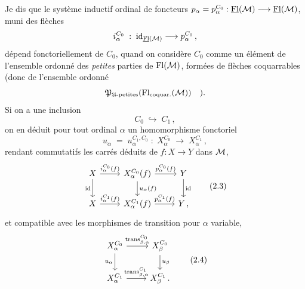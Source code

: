 Je dis que le système inductif ordinal de foncteurs $p_\alpha=p_\alpha^{C_0} : \underline{\mathrm{Fl}}(\mathcal{M})\longrightarrow\underline{\mathrm{Fl}}(\mathcal{M})$,
muni des flèches
\[
i_\alpha^{C_0} \;:\; \mathrm{id}_{\underline{\mathrm{Fl}}(\mathcal{M})} \longrightarrow p_\alpha^{C_0}\,,
\]
dépend fonctoriellement de $C_0$, quand on considère $C_0$ comme un élément de l'ensemble ordonné des \textit{petites} parties de $\mathrm{Fl}(\mathcal{M})$, formées de flèches coquarrables (donc de l'ensemble ordonné
\[
\mathfrak{P}_{\mathfrak{U}\text{-petites}}(\mathrm{Fl}_{\text{coquar.}}(\mathcal{M})) \quad ).
\]
Si on a une inclusion
\[
C_0 \;\hookrightarrow\; C_1\,,
\tag*{(2.1)}
\]
on en déduit pour tout ordinal $\alpha$ un homomorphisme fonctoriel
\[
u_\alpha \;=\; u_\alpha^{C_1,C_0} \;:\; X_\alpha^{C_0} \;\longrightarrow\; X_\alpha^{C_1}\,,
\tag*{(2.2)}
\]
rendant commutatifs les carrés déduits de $f : X\longrightarrow Y$ dans $\mathcal{M}$,
\[
\begin{tikzcd}
X \arrow[r, "i_\alpha^{C_0}(f)"] \arrow[d, "\mathrm{id}"'] & X_\alpha^{C_0}(f) \arrow[r, "p_\alpha^{C_0}(f)"] \arrow[d, "u_\alpha(f)"] & Y \arrow[d, "\mathrm{id}"] \\
X \arrow[r, "i_\alpha^{C_1}(f)"] & X_\alpha^{C_1}(f) \arrow[r, "p_\alpha^{C_1}(f)"] & Y\,,
\end{tikzcd}
\tag*{(2.3)}
\]
et compatible avec les morphismes de transition pour $\alpha$ variable,
\[
\begin{tikzcd}
X_\alpha^{C_0} \arrow[r, "{\mathrm{trans}_{\beta,\alpha}^{C_0}}"] \arrow[d, "u_\alpha"'] & X_\beta^{C_0} \arrow[d, "u_\beta"] \\
X_\alpha^{C_1} \arrow[r, "{\mathrm{trans}_{\beta,\alpha}^{C_1}}"] & X_\beta^{C_1}\,.
\end{tikzcd}
\tag*{(2.4)}
\]


